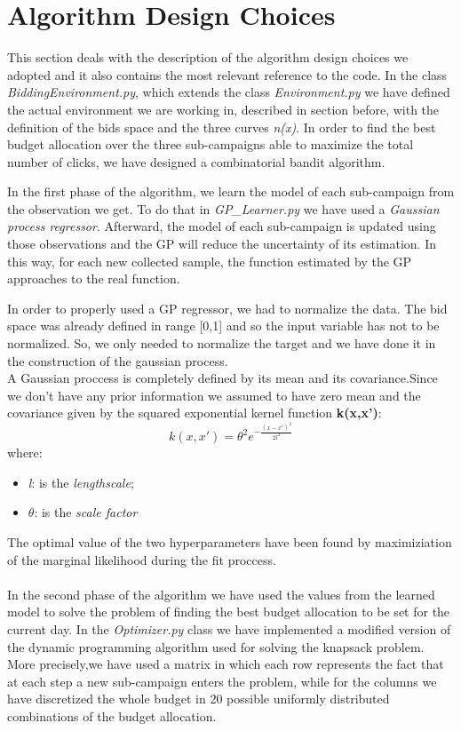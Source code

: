 \section{Algorithm Design Choices}

This section deals with the description of the algorithm design choices we adopted and
it also contains the most relevant reference to the code.
In the class \textit{BiddingEnvironment.py}, which extends the class \textit{Environment.py} we have defined the actual environment we are working in, described in section before, with the definition of the bids space and the three curves \textit{n(x)}.
In order to find the best budget allocation over the three sub-campaigns able to maximize the total number of clicks, we have designed a combinatorial bandit algorithm.

In the first phase of the algorithm, we learn the model of each sub-campaign from the observation we get.
To do that in \textit{GP\_Learner.py} we have used a \textit{Gaussian process regressor}.
Afterward, the model of each sub-campaign is updated using those observations and the GP will reduce the uncertainty of its estimation.
In this way, for each new collected sample, the function estimated by the GP approaches to the real function.


In order to properly used a GP regressor, we had to normalize the data. The bid space was already defined in range [0,1] and so the input variable has not to be normalized. So, we only needed to normalize the target and we have done it in the construction of the gaussian process.\\
A Gaussian proccess is completely defined by its mean and its covariance.Since we don't have any prior information we assumed to have zero mean and the covariance given by the squared exponential kernel function \textbf{k(x,x')}:
\begin{equation}
	k(x,x') = \theta^{2} e^{-\frac{(x-x')^2}{2 l^2}}
\end{equation}
where:
\begin{itemize}
	\item \textit{l}: is the \textit{lengthscale};
	\item $\theta$: is the \textit{scale factor}
\end{itemize}
The optimal value of the two hyperparameters have been found by maximiziation of the marginal likelihood during the fit proccess.
\\
\\
In the second phase of the algorithm we have used the values from the learned model to solve the problem of finding the best budget allocation to be set for the current day.
In the \textit{Optimizer.py} class we have implemented a modified version of the dynamic programming algorithm used for solving the knapsack problem.
More precisely,we have used a matrix in which each row represents the fact that at each step a new sub-campaign enters the problem, while for the columns we have discretized the whole budget in 20 possible uniformly distributed combinations of the budget allocation.

